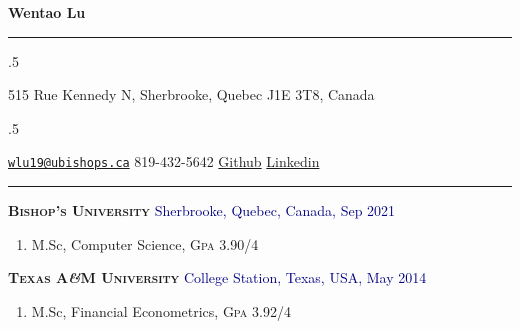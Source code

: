 \documentclass[11pt]{article}
\begin{document}
\centerline{\huge \bf Wentao Lu}

\vspace{2 mm}

\hrule

\vspace{2 mm}


\moveleft.5\hoffset\centerline{515 Rue Kennedy N, Sherbrooke, Quebec J1E 3T8, Canada}
\moveleft.5\hoffset\centerline{
\faEnvelopeO \hspace{1 mm} \href{mailto:}{\href{mailto:wlu19@ubishops.ca}{\nolinkurl{wlu19@ubishops.ca}}} \hspace{1 mm} \faPhone \hspace{1 mm}  819-432-5642  \hspace{1 mm}  \faGithub \hspace{1 mm} \href{http://github.com/neo-mashiro}{Github} \hspace{1 mm}  \faGlobe \hspace{1 mm} \href{https://www.linkedin.com/in/wentao-lu-90125157}{Linkedin}}

\vspace{2mm}

\hrule




\textbf{\textsc{Bishop's University}} \hfill \textcolor{Navy}{Sherbrooke, Quebec, Canada, Sep 2021}
\begin{enumerate}[leftmargin=*, topsep=-2mm, itemsep=-2mm]
  \item[] M.Sc, Computer Science, \textsc{Gpa} 3.90/4
\end{enumerate}

\textbf{\textsc{Texas {\small A\textit{\&}M} University}} \hfill \textcolor{Navy}{College Station, Texas, USA, May 2014}
\begin{enumerate}[leftmargin=*, topsep=-2mm, itemsep=-2mm]
  \item[] M.Sc, Financial Econometrics, \textsc{Gpa} 3.92/4
\end{enumerate}
\end{document}
